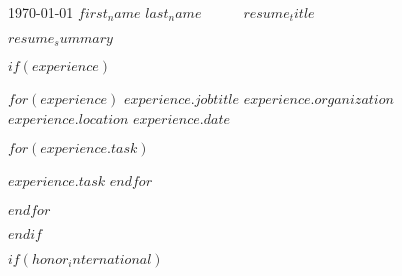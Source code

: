 \documentclass[11pt, a4paper]{awesome-cv}
\begin{document}
    \makecvheader[C]

    \makecvfooter
    {\today}
    {$first_name$ $last_name$~~~\textperiodcentered~~~$resume_title$}
    {\thepage}




    \begin{cvparagraph}
        $resume_summary$
    \end{cvparagraph}


    $if(experience)$

    \begin{cventries}
        $for(experience)$
        \cventry
        {$experience.jobtitle$}
        {$experience.organization$}
        {$experience.location$}
        {$experience.date$}
        {
        \begin{cvitems}
            $for(experience.task)$
            \item {$experience.task$}
            $endfor$
        \end{cvitems}
        }
        $endfor$
    \end{cventries}
    $endif$



    $if(honor_international)$
\end{document}
